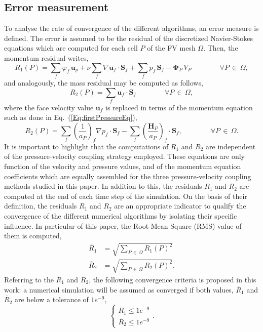 \documentclass[final,3p,times,11pt,onecolumn]{myElsarticle}
\numberwithin{equation}{section}
\begin{document}
\subsection{Error measurement}
To analyse the rate of convergence of the different algorithms, an error measure is defined. The error is assumed to be the residual of the discretized Navier-Stokes equations which are computed for each cell $P$ of the FV mesh $\Omega$. Then, the momentum residual writes,
\begin{equation}
\label{Eq:R1Discretized}
R_1(P)
=
\sum_{f}
\varphi_f\,
\boldsymbol{u}_p
+
\nu
\sum_f
\nabla \boldsymbol{u}_f
\cdot
\boldsymbol{S}_f
+
\sum_f
p_f
\,
\boldsymbol{S}_f
-
\boldsymbol{\Phi}_P \, V_P
\qquad \qquad
\forall P\,\in\,\Omega,
\end{equation}
and analogously, the mass residual may be computed as follows,
\begin{equation}
R_2(P)
=
\sum_f
\boldsymbol{u}_f
\cdot
\boldsymbol{S}_f
\qquad \qquad
\forall P\,\in\,\Omega,
\end{equation}
where the face velocity value $\boldsymbol{u}_f$ is replaced in terms of the momentum equation such as done in Eq.~(\ref{Eq:firstPressureEq}),
\begin{equation}
\label{Eq:R2Discretized}
R_2(P)
=
\sum_f 
\left(
\frac{1}{a_P}
\right)_f 
\nabla p_f
\cdot
\boldsymbol{S}_f 
-
\sum_f
\left(
\frac{\boldsymbol{H}_P}
{a_P}
\right)_f 
\cdot 
\boldsymbol{S}_f,
\qquad \qquad
\forall P\,\in\,\Omega.
\end{equation}
It is important to highlight that the computations of $R_1$ and $R_2$ are independent of the pressure-velocity coupling strategy employed. These equations are only function of the velocity and pressure values, and of the momentum equation coefficients which are equally assembled for the three pressure-velocity coupling methods studied in this paper. In addition to this, the residuals $R_1$ and $R_2$ are computed at the end of each time step of the simulation. 
On the basis of their definition, the residuals $R_1$ and $R_2$ are an appropriate indicator to qualify the convergence of the different numerical algorithms by isolating their specific influence. In particular of this paper, the Root Mean Square (RMS) value of them is computed, 
\begin{align}
\overline{R}_1
&=
\sqrt
{
\sum_{P\,\in\,\Omega}
R_1(P)^2
}
\\
\overline{R}_2
&=
\sqrt
{
\sum_{P\,\in\,\Omega}
R_2(P)^2
}.
\end{align}
Referring to the $\overline{R}_1$ and $\overline{R}_2$, the following convergence criteria is proposed in this work: a numerical simulation will be assumed as converged if both values, $\overline{R}_1$ and $\overline{R}_2$  are below a tolerance of $1e^{-9}$,
\begin{equation}
\label{Eq:convergenceCriteria}
\left\lbrace
\begin{array}{c}
\overline{R}_1 \leq 1e^{-9} \\
\overline{R}_2 \leq 1e^{-9}
\end{array}
\right..
\end{equation}
\end{document}
